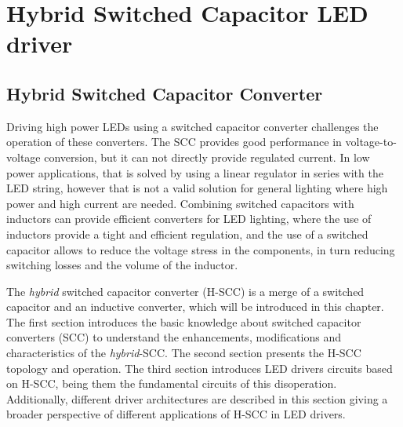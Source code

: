 \part{Hybrid Switched Capacitor LED driver}
\chapter{Hybrid Switched Capacitor Converter}
\label{ch:H-SCC}
Driving high power LEDs using a switched capacitor converter challenges the operation of these converters. The SCC provides good performance in voltage-to-voltage conversion, but it can not directly provide regulated current. In low power applications, that is solved by using a linear regulator in series with the LED string, however that is not a valid solution for general lighting where high power and high current are needed. Combining switched capacitors with inductors can provide efficient converters for LED lighting, where the use of inductors provide a tight and efficient regulation, and the use of a switched capacitor allows to reduce the voltage stress in the components, in turn reducing switching losses and the volume of the inductor.

The \emph{hybrid} switched capacitor converter (H-SCC) is a merge of a switched capacitor and an inductive converter, which will be introduced in this chapter. The first section introduces the basic knowledge about switched capacitor converters (SCC) to understand the enhancements, modifications and characteristics of the \emph{hybrid}-SCC. The second section presents the H-SCC topology and  operation. The third section introduces LED drivers circuits based on H-SCC, being them the fundamental circuits of this disoperation. Additionally, different driver architectures are described in this section giving a broader perspective of different applications of H-SCC in LED drivers.


